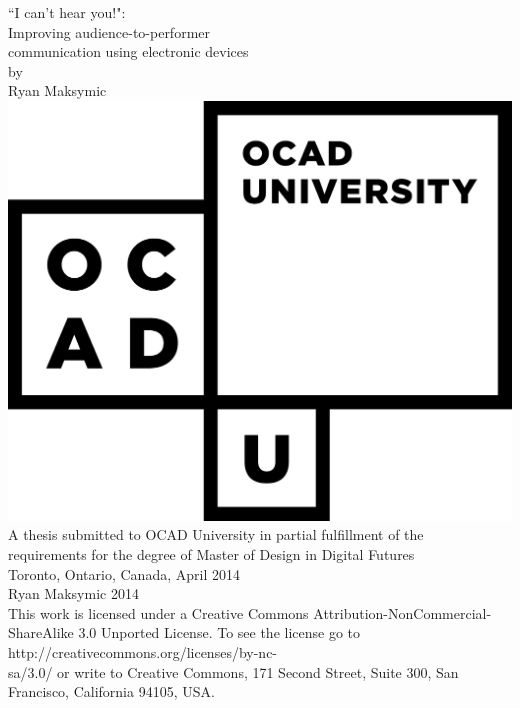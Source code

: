\begin{titlepage}
\begin{center}

\LARGE{``I can't hear you!": \\Improving audience-to-performer\\communication using electronic devices}\\[0.5cm]
\large{by\\[0.5cm]
Ryan Maksymic}\\[1.5cm]
\includegraphics[scale=0.3]{ocadu_logo.png}\\[1cm]
\small
A thesis submitted to OCAD University in partial fulfillment of the\\
requirements for the degree of Master of Design in Digital Futures\\[1cm]
Toronto, Ontario, Canada, April 2014\\[1cm]
\ccLogo \hspace{0.05cm} Ryan Maksymic 2014\\
This work is licensed under a Creative Commons Attribution-NonCommercial-ShareAlike 3.0 Unported License. To see the license go to http://creativecommons.org/licenses/by-nc-\\sa/3.0/ or write to Creative Commons, 171 Second Street, Suite 300, San Francisco, California 94105, USA.

\end{center}
\end{titlepage}